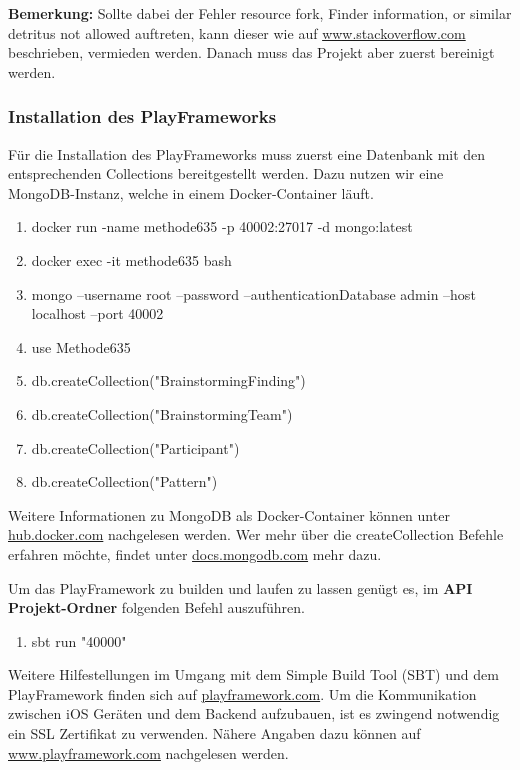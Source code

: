 \textbf{Bemerkung:} Sollte dabei der Fehler \grqq resource fork, Finder information, or similar detritus not allowed\grqq{} auftreten, kann dieser wie auf \href{https://stackoverflow.com/questions/39652867/code-sign-error-in-macos-high-sierra-xcode-resource-fork-finder-information}{www.stackoverflow.com} beschrieben, vermieden werden. Danach muss das Projekt aber zuerst bereinigt werden.

\subsubsection*{Installation des PlayFrameworks}
Für die Installation des PlayFrameworks muss zuerst eine Datenbank mit den entsprechenden Collections bereitgestellt werden. Dazu nutzen wir eine MongoDB-Instanz, welche in einem Docker-Container läuft.

\begin{enumerate}
  \item docker run -name methode635 -p 40002:27017 -d mongo:latest
  \item docker exec -it methode635 bash
  \item mongo --username root --password --authenticationDatabase admin --host localhost --port 40002
  \item use Methode635
  \item db.createCollection("BrainstormingFinding")
  \item db.createCollection("BrainstormingTeam")
  \item db.createCollection("Participant")
  \item db.createCollection("Pattern")
\end{enumerate}

Weitere Informationen zu MongoDB als Docker-Container können unter \href{https://hub.docker.com/_/mongo/}{hub.docker.com} nachgelesen werden. Wer mehr über die createCollection Befehle erfahren möchte, findet unter \href{https://docs.mongodb.com/manual/reference/method/db.createCollection/index.html}{docs.mongodb.com} mehr dazu.

Um das PlayFramework zu builden und laufen zu lassen genügt es, im \textbf{API Projekt-Ordner} folgenden Befehl auszuführen.

\begin{enumerate}
  \item sbt run "40000"
\end{enumerate}

Weitere Hilfestellungen im Umgang mit dem Simple Build Tool (SBT) und dem PlayFramework finden sich auf \href{https://www.playframework.com/documentation/2.6.x/PlayConsole}{playframework.com}. Um die Kommunikation zwischen iOS Geräten und dem Backend aufzubauen, ist es zwingend notwendig ein SSL Zertifikat zu verwenden. Nähere Angaben dazu können auf \href{https://www.playframework.com/documentation/2.6.x/ConfiguringHttps#SSL-Certificates}{www.playframework.com} nachgelesen werden.


